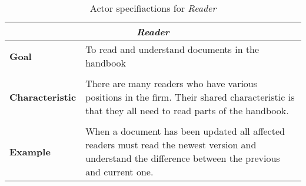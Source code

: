 \begin{table}[H]
	\begin{tabular}{l m{11.3cm}}
		\hline
		\multicolumn{2}{c}{\textbf{\textit{Reader}}}\\
		\hline
		\textbf{Goal} & To read and understand documents in the handbook \\
		 &  \\
		\textbf{Characteristic} & There are many readers who have various positions in the firm. Their shared characteristic is that they all need to read parts of the handbook. \\
		 &  \\
		\textbf{Example} & When a document has been updated all affected readers must read the newest version and understand the difference between the previous and current one. \\
		\hline
	\end{tabular}
	\caption{Actor specifiactions for \textit{Reader}}\label{tab:Actor-read}
\end{table}
